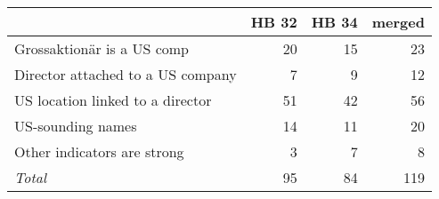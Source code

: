 \begin{tabular}{lrrr}
\toprule
 & HB 32 & HB 34 & merged \\
\midrule
Grossaktionär is a US comp & 20 & 15 & 23 \\
Director attached to a US company & 7 & 9 & 12 \\
US location linked to a director & 51 & 42 & 56 \\
US-sounding names & 14 & 11 & 20 \\
Other indicators are strong & 3 & 7 & 8 \\
\emph{Total} & 95 & 84 & 119 \\
\bottomrule
\end{tabular}
